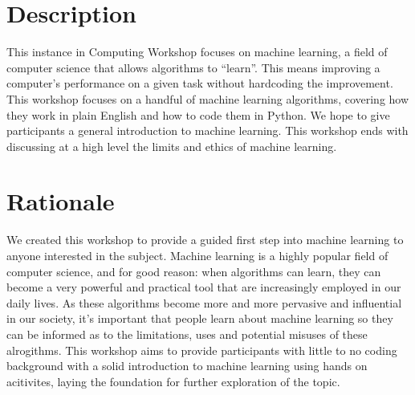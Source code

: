 \documentclass[11pt]{article}
\begin{document}
\begin{multicols}{2}
\columnbreak
\section*{Description}

This instance in Computing Workshop focuses on machine
learning, a field of computer science that allows algorithms to ``learn''. This
means improving a computer's performance on a given task without hardcoding the
improvement. This workshop focuses on a handful of machine learning algorithms, covering how they work in plain English and
how to code them in Python. We hope to give participants a general introduction to machine learning. This workshop ends with
discussing at a high level the limits and ethics of machine learning.

\section*{Rationale}

We created this workshop to provide a guided first step into machine learning to
anyone interested in the subject.
Machine learning is a highly popular field of computer science, and for good
reason:
when algorithms can learn, they can become a very powerful and practical tool
that are increasingly employed in our daily lives.
As these algorithms become more and more pervasive and influential in our
society, it's important that people learn about machine learning so they can be
informed as to the limitations, uses and potential misuses of these alrogithms.
This workshop aims to provide participants with little to no coding
background with a solid introduction to machine learning using hands on
acitivites, laying the foundation for further exploration of the topic.
\end{multicols}
\end{document}
